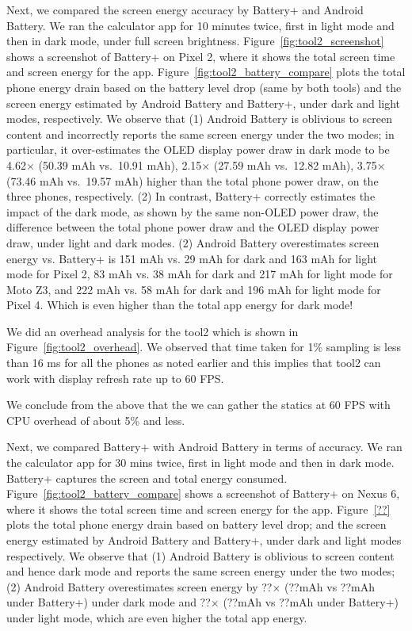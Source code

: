Next, we compared the screen energy accuracy by 
Battery+ and Android Battery.
We ran the calculator app for 10 minutes twice, first in light mode and then in
dark mode, under full screen brightness.
Figure~\ref{fig:tool2_screenshot} shows a screenshot of
Battery+ on Pixel 2, where it shows the total screen time and screen energy
for the app.
Figure~\ref{fig:tool2_battery_compare} plots the
total phone energy drain based on the battery level drop (same by  both tools)
and the screen energy estimated by Android Battery and Battery+,
under dark and light modes, respectively.
We observe that
(1) Android Battery is oblivious to screen content and incorrectly reports
the same screen energy under the two modes;
in particular, it over-estimates the  OLED display power draw in dark mode
to be 4.62$\times$ (50.39 mAh vs.\ 10.91 mAh), 
2.15$\times$ (27.59 mAh vs.\ 12.82 mAh), 
3.75$\times$ (73.46 mAh vs.\ 19.57 mAh)
higher than the total phone power draw, on the three phones, respectively.
(2) In contrast, Battery+ correctly estimates the impact of the dark mode,
as shown by the same non-OLED power draw, \ie the difference 
between the total phone power draw and the OLED display power draw,
under light and dark modes.
(2) Android Battery overestimates screen energy vs. Battery+ is
151 mAh vs. 29 mAh for dark and 163 mAh for light mode for Pixel 2,
83 mAh vs. 38 mAh for dark and 217 mAh for light mode for Moto Z3, and
222 mAh vs. 58 mAh for dark and 196 mAh for light mode for Pixel 4.
Which is even higher than the total app energy for dark mode!
\fi

We did an overhead analysis for the tool2 which is shown in Figure~\ref{fig:tool2_overhead}.
We observed that time taken for 1\% sampling is less than 16 ms for all the phones
as noted earlier and this  implies that tool2 can work with display refresh rate up to 60 FPS.

We conclude from the above that the we can gather the statics at
60 FPS with CPU overhead of about 5\% and less.

Next, we compared Battery+ with Android Battery in terms of accuracy.
We ran the calculator app for 30 mins twice, first in light mode and then in
dark mode. Battery+ captures the screen and total energy
consumed. 
Figure~\ref{fig:tool2_battery_compare} shows a screenshot of
Battery+ on Nexus 6, where it shows the total screen time and screen energy
for the app.
Figure~\ref{??} plots the
total phone energy drain based on battery level drop;
and the screen energy estimated by Android Battery and Battery+,
under dark and light modes respectively.
We observe that
(1) Android Battery is oblivious to screen content and hence
dark mode and reports the same screen energy under the two modes;
(2) Android Battery overestimates screen energy
by ??$\times$ (??mAh vs ??mAh under Battery+) under dark mode
and ??$\times$ (??mAh vs ??mAh under Battery+) under light mode,
which are even higher the total app energy.
\fi

